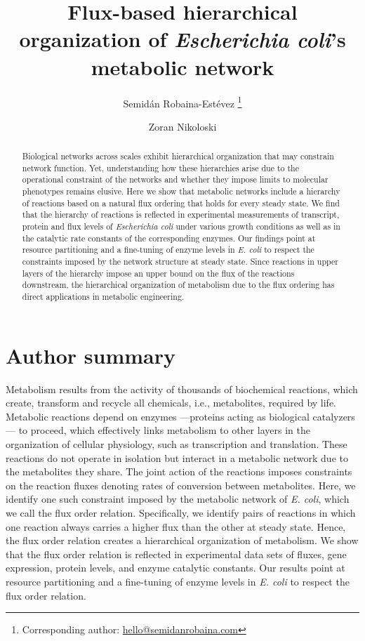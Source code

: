 \documentclass[12pt]{article}
\title{Flux-based hierarchical organization of \emph{Escherichia coli}'s metabolic network}
\author[1,2,3]{Semid\'an Robaina-Est\'evez \footnote{Corresponding author: \href{mailto:hello@semidanrobaina.com}{hello@semidanrobaina.com}}}
\author[1,2]{Zoran Nikoloski}
\affil[1]{Systems Biology and Mathematical Modeling Group
Max Planck Institute of Molecular Plant Physiology}
\affil[2]{Bioinformatics Group, University of Potsdam, Potsdam, Germany}
\affil[3]{Ronin Institute for Independent Scholarship}
\date{\vspace{-5ex}}
\begin{document}
\maketitle
% 


\begin{abstract}
Biological networks across scales exhibit hierarchical organization that may constrain network function. Yet, understanding how these hierarchies arise due to the operational constraint of the networks and whether they impose limits to molecular phenotypes remains elusive. Here we show that metabolic networks include a hierarchy of reactions based on a natural flux ordering that holds for every steady state. We find that the hierarchy of reactions is reflected in experimental measurements of transcript, protein and flux levels of \emph{Escherichia coli} under various growth conditions as well as in the catalytic rate constants of the corresponding enzymes. Our findings point at resource partitioning and a fine-tuning of enzyme levels in \emph{E. coli} to respect the constraints imposed by the network structure at steady state. Since reactions in upper layers of the hierarchy impose an upper bound on the flux of the reactions downstream, the hierarchical organization of metabolism due to the flux ordering has direct applications in metabolic engineering.
\end{abstract}

{\color{blue}
\section*{Author summary}
Metabolism results from the activity of thousands of biochemical reactions, which create, transform and recycle all chemicals, i.e., metabolites, required by life. Metabolic reactions depend on enzymes ---proteins acting as biological catalyzers --- to proceed, which effectively links metabolism to other layers in the organization of cellular physiology, such as transcription and translation. These reactions do not operate in isolation but interact in a metabolic network due to the metabolites they share. The joint action of the reactions imposes constraints on the reaction fluxes denoting rates of conversion between metabolites. Here, we identify one such constraint imposed by the metabolic network of \emph{E. coli}, which we call the flux order relation. Specifically, we identify pairs of reactions in which one reaction always carries a higher flux than the other at steady state. Hence, the flux order relation creates a hierarchical organization of metabolism. We show that the flux order relation is reflected in experimental data sets of fluxes, gene expression, protein levels, and enzyme catalytic constants. Our results point at resource partitioning and a fine-tuning of enzyme levels in \emph{E. coli} to respect the flux order relation.
}
\end{document}
